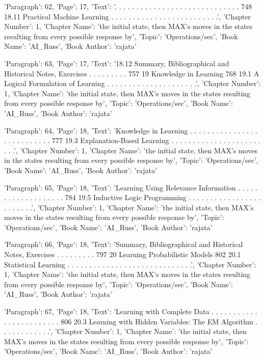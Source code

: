 {'Paragraph': 62, 'Page': 17, 'Text': '. . . . . . . . . . . . . . . . . . . . . . . . . . . . . 748 18.11 Practical Machine Learning . . . . . . . . . . . . . . . . . . . . . . . . .', 'Chapter Number': 1, 'Chapter Name': 'the initial state, then MAX’s moves in the states resulting from every possible response by', 'Topic': 'Operations/sec', 'Book Name': 'AI_Russ', 'Book Author': 'rajata'}

{'Paragraph': 63, 'Page': 17, 'Text': '18.12 Summary, Bibliographical and Historical Notes, Exercises . . . . . . . . . 757 19 Knowledge in Learning 768 19.1 A Logical Formulation of Learning . . . . . . . . . . . . . . . . . . . . .', 'Chapter Number': 1, 'Chapter Name': 'the initial state, then MAX’s moves in the states resulting from every possible response by', 'Topic': 'Operations/sec', 'Book Name': 'AI_Russ', 'Book Author': 'rajata'}

{'Paragraph': 64, 'Page': 18, 'Text': 'Knowledge in Learning . . . . . . . . . . . . . . . . . . . . . . . . . . . 777 19.3 Explanation-Based Learning . . . . . . . . . . . . . . . . . . . . . . . .', 'Chapter Number': 1, 'Chapter Name': 'the initial state, then MAX’s moves in the states resulting from every possible response by', 'Topic': 'Operations/sec', 'Book Name': 'AI_Russ', 'Book Author': 'rajata'}

{'Paragraph': 65, 'Page': 18, 'Text': 'Learning Using Relevance Information . . . . . . . . . . . . . . . . . . . 784 19.5 Inductive Logic Programming . . . . . . . . . . . . . . . . . . . . . . . .', 'Chapter Number': 1, 'Chapter Name': 'the initial state, then MAX’s moves in the states resulting from every possible response by', 'Topic': 'Operations/sec', 'Book Name': 'AI_Russ', 'Book Author': 'rajata'}

{'Paragraph': 66, 'Page': 18, 'Text': 'Summary, Bibliographical and Historical Notes, Exercises . . . . . . . . . 797 20 Learning Probabilistic Models 802 20.1 Statistical Learning . . . . . . . . . . . . . . . . . . . . . . . . . . . . .', 'Chapter Number': 1, 'Chapter Name': 'the initial state, then MAX’s moves in the states resulting from every possible response by', 'Topic': 'Operations/sec', 'Book Name': 'AI_Russ', 'Book Author': 'rajata'}

{'Paragraph': 67, 'Page': 18, 'Text': 'Learning with Complete Data . . . . . . . . . . . . . . . . . . . . . . . . 806 20.3 Learning with Hidden Variables: The EM Algorithm . . . . . . . . . . . .', 'Chapter Number': 1, 'Chapter Name': 'the initial state, then MAX’s moves in the states resulting from every possible response by', 'Topic': 'Operations/sec', 'Book Name': 'AI_Russ', 'Book Author': 'rajata'}

